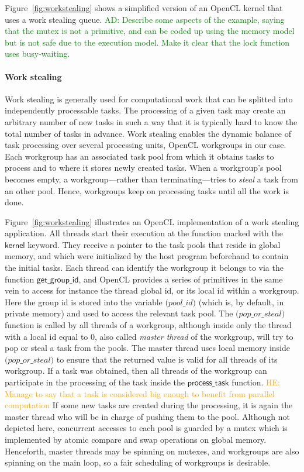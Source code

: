 \documentclass[nocopyrightspace,10pt]{sigplanconf}
\newcommand{\ADComment}[1]{\textcolor{green}{AD: #1}}
\newcommand{\HEComment}[1]{\textcolor{orange}{HE: #1}}
\newcommand{\myfiglong}{Figure~}
\newcommand{\getgroupid}{\mathsf{get\_group\_id}}
\begin{document}
Figure~\ref{fig:workstealing} shows a simplified version of an OpenCL
kernel that uses a work stealing queue.  \ADComment{Describe some
  aspects of the example, saying that the mutex is not a primitive,
  and can be coded up using the memory model but is not safe due to
  the execution model.  Make it clear that the lock function uses
  busy-waiting.}  

\paragraph{Work stealing}
Work stealing is generally used for computational work that can be
splitted into independently processable tasks. The processing of a given
task may create an arbitrary number of new tasks in such a way that it
is typically hard to know the total number of tasks in advance. Work
stealing enables the dynamic balance of task processing over several
processing units, OpenCL workgroups in our case. Each workgroup has an
associated task pool from which it obtains tasks to process and to where
it stores newly created tasks. When a workgroup's pool becomes empty, a
workgroup---rather than terminating---tries to \emph{steal} a task from
an other pool. Hence, workgroups keep on processing tasks until all the
work is done.

\myfiglong\ref{fig:workstealing} illustrates an OpenCL implementation of
a work stealing application. All threads start their execution at the
function marked with the $\mathsf{kernel}$ keyword. They receive a
pointer to the task pools that reside in global memory, and which were
initialized by the host program beforehand to contain the initial
tasks. Each thread can identify the workgroup it belongs to via the
function $\getgroupid$, and OpenCL provides a series of primitives in the
same vein to access for instance the thread global id, or its local id
within a workgroup. Here the group id is stored into the variable
$\mathsf(pool\_id)$ (which is, by default, in private memory) and used
to access the relevant task pool. The $\mathsf(pop\_or\_steal)$ function
is called by all threads of a workgroup, although inside only the thread
with a local id equal to $0$, also called \emph{master thread} of the
workgroup, will try to pop or steal a task from the pools. The master
thread uses local memory inside $\mathsf(pop\_or\_steal)$ to ensure that
the returned value is valid for all threads of its workgroup. If a task
was obtained, then all threads of the workgroup can participate in the
processing of the task inside the $\mathsf{process\_task}$
function. \HEComment{Manage to say that a task is considered big enough
to benefit from parallel computation} If some new tasks are created
during the processing, it is again the master thread who will be in
charge of pushing them to the pool. Although not depicted here,
concurrent accesses to each pool is guarded by a mutex which is
implemented by atomic compare and swap operations on global
memory. Henceforth, master threads may be spinning on mutexes, and
workgroups are also spinning on the main loop, so a fair scheduling of
workgroups is desirable.
\end{document}
